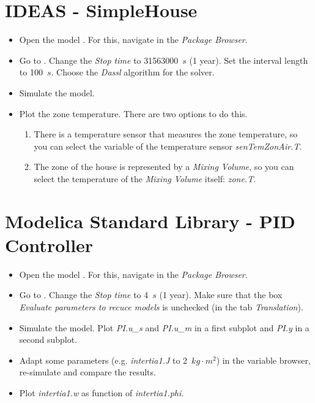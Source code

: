\documentclass[10pt,a4paper]{article}
\begin{document}
\section{IDEAS - SimpleHouse}

\begin{itemize}
	\item Open the model . For this, navigate in the \textit{Package Browser}.
	\item Go to . Change the \textit{Stop time} to 31563000~$s$ (1 year). Set the interval length to 100~$s$. Choose the \textit{Dassl} algorithm for the solver.
	\item Simulate the model.
	\item Plot the zone temperature. There are two options to do this. 
	\begin{enumerate}
		\item There is a temperature sensor that measures the zone temperature, so you can select the variable of the temperature sensor \textit{senTemZonAir.T}.
		\item The zone of the house is represented by a \textit{Mixing Volume}, so you can select the temperature of the \textit{Mixing Volume} itself: \textit{zone.T}.
	\end{enumerate}
\end{itemize}


\section{Modelica Standard Library - PID Controller}

\begin{itemize}
	\item Open the model . For this, navigate in the \textit{Package Browser}.
	\item Go to . Change the \textit{Stop time} to 4~$s$ (1 year). Make sure that the box \textit{Evaluate parameters to recuce models} is unchecked (in the tab \textit{Translation}).
	\item Simulate the model. Plot \textit{PI.u\_s} and \textit{PI.u\_m} in a first subplot and \textit{PI.y} in a second subplot.
	\item Adapt some parameters (e.g. \textit{intertia1.J} to 2~$kg \cdot m^2$) in the variable browser, re-simulate and compare the results.
	\item Plot \textit{intertia1.w} as function of \textit{intertia1.phi}.
\end{itemize}
\end{document}
